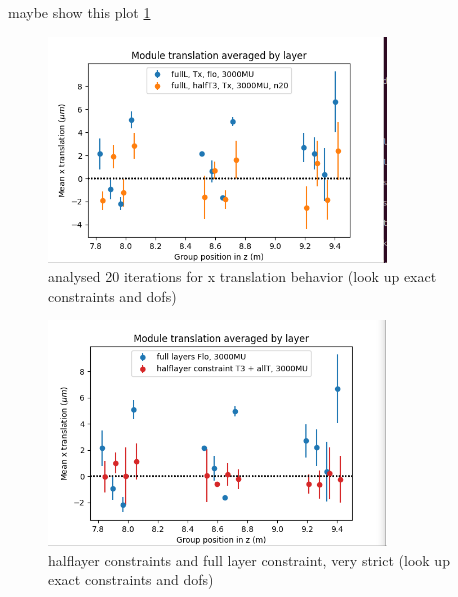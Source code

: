 maybe show this plot \ref{fig:june_3}
\begin{figure}
  \centering
  \includegraphics[width=0.8\textwidth]{plots/june_21/allT_halfT3_n20_Tx.png}
  \caption{analysed 20 iterations for x translation behavior (look up exact constraints and dofs)}
  \label{fig:june_3}
\end{figure}

\begin{figure}
  \centering
  \includegraphics[width=0.8\textwidth]{plots/june_21/allT_halfT3_Tx_vs_Flo.png}
  \caption{halflayer constraints and full layer constraint, very strict (look up exact constraints and dofs)}
  \label{fig:june_4}
\end{figure}


